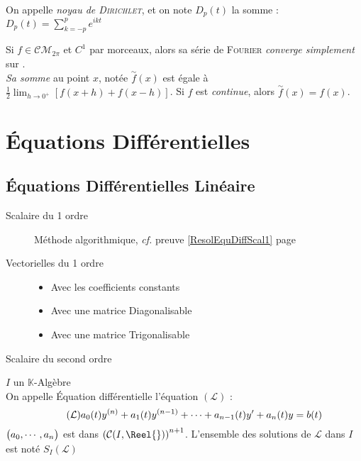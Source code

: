 \documentclass[11pt,a4paper,fleqn,pdftex]{report}
\begin{document}
\begin{dfn}
On appelle \emph{noyau de \textsc{Dirichlet}}, et on note $D_p(t)$ la somme : $D_p(t)=\sum_{k=-p}^p e^{ikt}$
\end{dfn}
\begin{itheorem}
Si $f \in \mathcal{CM}_{2\pi}$ et $C^1$ par morceaux, alors sa série de \textsc{Fourier} \emph{converge simplement} sur \Reel{}. \\
\emph{Sa somme} au point $x$, notée $\overset{\sim}{f}(x)$ est égale à $\frac{1}{2}\lim_{h\to 0^+}[f(x+h) + f(x-h)]$. Si $f$ est \emph{continue}, alors $\overset{\sim}{f}(x) = f(x)$.
\end{itheorem}
\part{Équations Différentielles}
\chapter{Équations Différentielles Linéaire}
\begin{methode}
\begin{description}
    \item[Scalaire du 1\ier{} ordre]
                Méthode algorithmique, \textit{cf.} preuve \ref{ResolEquDiffScal1} page \pageref{ResolEquDiffScal1}
    \item[Vectorielles du 1\ier{} ordre] \hfill
    \begin{itemize}\itemsep2pt %
                    \item Avec les coefficients constants
                    \item Avec une matrice Diagonalisable
                    \item Avec une matrice Trigonalisable
    \end{itemize}

    \item[Scalaire du second ordre]
\end{description}

\end{methode}

\begin{dfn}
$I$ un $\mathbb{K}$-Algèbre\\
On appelle Équation différentielle l'équation $(\mathcal{L})$ :
\begin{equation}\tag{\ensuremath{\mathcal{L}}}
a_0(t)y^{(n)}+a_1(t) y^{(n-1)}+\cdots + a_{n-1}(t) y' + a_n(t) y = b(t)
\end{equation}
$\left( \vphantom{3^3} a_0,\cdots ,a_n \right)$ est dans $\left( \mathcal{C}(I,\Reel{})\right)^{n+1} $. L'ensemble des solutions de $\mathcal{L}$ dans $I$ est noté $S_I(\mathcal{L})$
\end{dfn}
\end{document}
